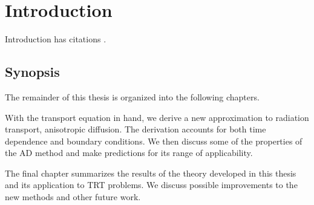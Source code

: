 
\chapter{Introduction}\label{chap:introduction}

Introduction has citations \cite{Abb1884}.

\section{Synopsis}

The remainder of this thesis is organized into the following chapters.

With the transport equation in hand, we derive a new approximation to radiation
transport, anisotropic diffusion. The derivation accounts for both time
dependence and boundary conditions. We then discuss some of the properties of
the AD method and make predictions for its range of applicability.

The final chapter summarizes the results of the theory developed in this thesis
and its application to TRT problems. We discuss possible improvements to the new
methods and other future work.

